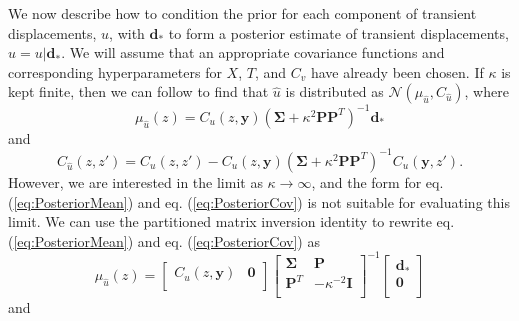 \documentclass[10pt,a4paper]{article}
\begin{document}
We now describe how to condition the prior for each component of transient displacements, $u$, with $\bm{d}_*$ to form a posterior estimate of transient displacements, $\hat{u} = u | \bm{d}_*$. We will assume that an appropriate covariance functions and corresponding hyperparameters for $X$, $T$, and $C_v$ have already been chosen. If $\kappa$ is kept finite, then we can follow \citet{Rasmussen2006} to find that $\hat{u}$ is distributed as $\mathcal{N}(\mu_{\hat{u}},C_{\hat{u}})$, where
\begin{equation}\label{eq:PosteriorMean}
\mu_{\hat{u}}(z) = C_u(z,\bm{y})\left(\bm{\Sigma} + \kappa^2\bm{P}\bm{P}^T\right)^{-1}\bm{d}_*
\end{equation}    
and
\begin{equation}\label{eq:PosteriorCov}
C_{\hat{u}}(z,z') = C_u(z,z') - C_u(z,\bm{y})\left(\bm{\Sigma} + \kappa^2\bm{P}\bm{P}^T\right)^{-1}C_u(\bm{y},z').
\end{equation}
However, we are interested in the limit as $\kappa \to \infty$, and the form for eq. (\ref{eq:PosteriorMean}) and eq. (\ref{eq:PosteriorCov}) is not suitable for evaluating this limit. We can use the partitioned matrix inversion identity \citep[e.g.,][]{Press2007} to rewrite eq. (\ref{eq:PosteriorMean}) and eq. (\ref{eq:PosteriorCov}) as
 \begin{equation}\label{eq:PosteriorMean2}
\mu_{\hat{u}}(z) = \left[\begin{array}{cc}
                         C_u(z,\bm{y}) & \bm{0} \\
                         \end{array}\right]
                   \left[\begin{array}{cc}
                         \bm{\Sigma} & \bm{P} \\
                         \bm{P}^T  & -\kappa^{-2} \bm{I} \\
                         \end{array}\right]^{-1}
                   \left[\begin{array}{c}
                         \bm{d}_* \\
                         \bm{0} \\
                         \end{array}\right]
\end{equation}    
and
\end{document}
